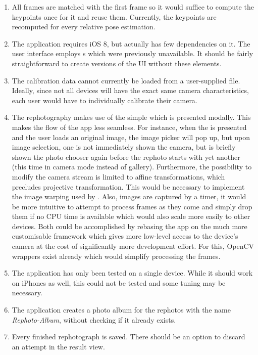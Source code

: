 \begin{enumerate}
   \item All frames are matched with the first frame so it would suffice to
      compute the keypoints once for it and reuse them. Currently, the keypoints
      are recomputed for every relative pose estimation.

   \item The application requires iOS 8, but actually has few dependencies on
      it. The user interface employs s which were
      previously unavailable. It should be fairly straightforward to create
      versions of the UI without these elements.

   \item The calibration data cannot currently be loaded from a user-supplied
      file. Ideally, since not all devices will have the exact same camera
      characteristics, each user would have to individually calibrate their
      camera.

   \item The rephotography makes use of the simple
       which is presented modally. This makes the
      flow of the app less seamless. For instance, when the
       is presented and the user loads an original image,
      the image picker will pop up, but upon image selection, one is not
      immediately shown the camera, but is briefly shown the photo chooser again
      before the rephoto starts with yet another 
      (this time in camera mode instead of gallery).
      Furthermore, the possibility to modify the camera stream is limited to
      affine transformations, which precludes projective transformation. This
      would be necessary to implement the image warping used by \citet{bae2010}.
      Also, images are captured by a timer, it would be more intuitive to
      attempt to process frames as they come and simply drop them if no CPU time
      is available which would also scale more easily to other devices. Both
      could be accomplished by rebasing the app on the much more customisable
       framework which gives more low-level access to the device's
      camera at the cost of significantly more development effort.
      For this, OpenCV wrappers exist already which would simplify processing the frames.  

   \item The application has only been tested on a single device. While it
      should work on iPhones as well, this could not be tested and some tuning
      may be necessary.

   \item The application creates a photo album for the rephotos with the name
      \emph{Rephoto-Album}, without checking if it already exists.

   \item Every finished rephotograph is saved. There should be an option to
      discard an attempt in the result view.

\end{enumerate}


